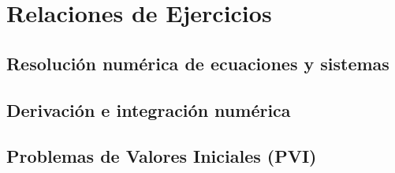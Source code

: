 \documentclass[12pt]{book}
\begin{document}

    
    

    \renewcommand{\theejercicio}{%
    \ifnum\value{section}=0 %
        \arabic{ejercicio}%
    \else
        \thesubsection.\arabic{ejercicio}%
    \fi
    }

    \fancyhead[R]{\helv \nouppercase{\rightmark}}
    \chapter{Relaciones de Ejercicios}
    \section{Resolución numérica de ecuaciones y sistemas}
    
    
    \newpage
    \section{Derivación e integración numérica}
    
    
    
    
    \newpage
    \section{Problemas de Valores Iniciales (PVI)}
    
    
\end{document}
